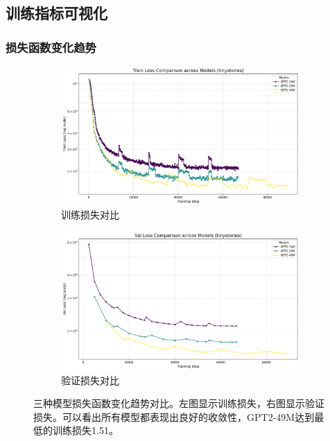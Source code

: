 \documentclass{article}
\begin{document}
\subsection{训练指标可视化}

\subsubsection{损失函数变化趋势}
\begin{figure}[h]
\centering
\begin{subfigure}[b]{0.45\textwidth}
\includegraphics[width=\textwidth]{../visualize/metrics/train_loss_comparison.png}
\caption{训练损失对比}
\label{fig:train_loss}
\end{subfigure}
\hfill
\begin{subfigure}[b]{0.45\textwidth}
\includegraphics[width=\textwidth]{../visualize/metrics/val_loss_comparison.png}
\caption{验证损失对比}
\label{fig:val_loss}
\end{subfigure}
\caption{三种模型损失函数变化趋势对比。左图显示训练损失，右图显示验证损失。可以看出所有模型都表现出良好的收敛性，GPT2-49M达到最低的训练损失1.51。}
\label{fig:loss_comparison}
\end{figure}
\end{document}
